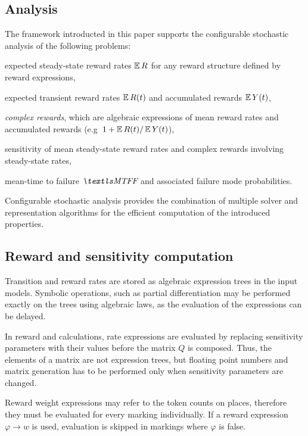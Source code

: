 \subsection{Analysis}

The framework introducted in this paper supports the configurable stochastic analysis of the following problems:
\begin{itemize*}
\item expected steady-state reward rates $\operatorname{\mathbb{E}} R$ for any reward
  structure defined by reward expressions,
\item expected transient reward rates $\operatorname{\mathbb{E}} R(t)$ and accumulated
  rewards $\operatorname{\mathbb{E}} Y(t)$,
\item \emph{complex rewards}, which are algebraic expressions of mean
  reward rates and accumulated rewards
  (e.g~$1 + \operatorname{\mathbb{E}} R(t) / \operatorname{\mathbb{E}} Y(t)$),
\item sensitivity of mean steady-state reward rates and complex
  rewards involving steady-state rates,
\item mean-time to failure $\MTFF$ and associated failure mode
  probabilities.
\end{itemize*}
Configurable stochastic analysis provides the combination of multiple solver and representation algorithms for the efficient computation of the introduced properties.

\subsection{Reward and sensitivity computation}

Transition and reward rates are stored as algebraic expression trees
in the input  models. Symbolic operations, such as partial
differentiation may be performed exactly on the trees using algebraic
laws, as the evaluation of the expressions can be delayed.

In reward and  calculations, rate expressions are
evaluated by replacing sensitivity parameters with their values before
the matrix $Q$ is composed. Thus, the elements of a matrix are not
expression trees, but floating point numbers and matrix generation
has to be performed only when sensitivity parameters are changed.

Reward weight expressions may refer to the token counts on places,
therefore they must be evaluated for every marking individually. If a
 reward expression $\varphi \rightarrow w$ is used,
evaluation is skipped in markings where $\varphi$ is false.

